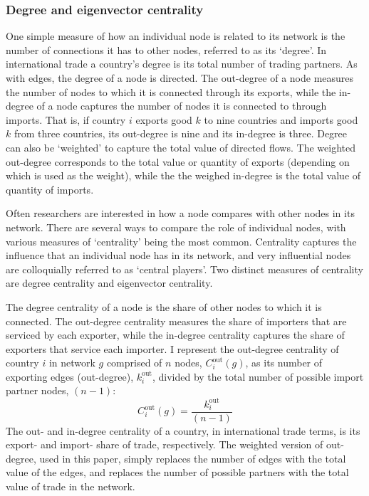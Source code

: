 \documentclass[10pt,letterpaper,pdftex]{article}
\begin{document}
\subsubsection{Degree and eigenvector centrality} \label{nw3}
One simple measure of how an individual node is related to its network is the number of connections it has to other nodes, referred to as its `degree'. In international trade a country's degree is its total number of trading partners. As with edges, the degree of a node is directed. The out-degree of a node measures the number of nodes to which it is connected through its exports, while the in-degree of a node captures the number of nodes it is connected to through imports. That is, if country $i$ exports good $k$ to nine countries and imports good $k$ from three countries, its out-degree is nine and its in-degree is three. Degree can also be `weighted' to capture the total value of directed flows.  The weighted out-degree corresponds to the total value or quantity of exports (depending on which is used as the weight), while the the weighed in-degree is the total value of quantity of imports. 

Often researchers are interested in how a node compares with other nodes in its network. There are several ways to compare the role of individual nodes, with various measures of `centrality' being the most common. Centrality captures the influence that an individual node has in its network, and very influential nodes are colloquially referred to as `central players'. Two distinct measures of centrality are degree centrality and eigenvector centrality. 

The degree centrality of a node is the share of other nodes to which it is connected. The out-degree centrality measures the share of importers that are serviced by each exporter, while the in-degree centrality captures the share of exporters that service each importer. I represent the out-degree centrality of country $i$ in network $g$ comprised of $n$ nodes, $C_i^{\text{out}}(g)$, as its number of exporting edges (out-degree), $k_i^{\text{out}}$, divided by the total number of possible import partner nodes, $(n-1)$:
\begin{equation} 
C_i^{\text{out}}(g) = \frac{k_i^{\text{out}}}{(n-1)}
\end{equation}
The out- and in-degree centrality of a country, in international trade terms, is its export- and import- share of trade, respectively. The weighted version of out-degree, used in this paper, simply replaces the number of edges with the total value of the edges, and replaces the number of possible partners with the total value of trade in the network.
\end{document}
